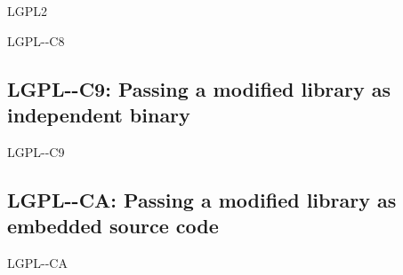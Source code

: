 \begin{license}{LGPL2}
\begin{lsuc}{LGPL-\ver-C8}
  \begin{lsucrequires}
    \lsucmandatory{\keepLicensingElements}
    \lsucmandatory{\lgpltwoEnsureCopyrightNoticeSource}
    \lsucmandatory{\giveLicense}\passingFilesCorrectly
    \lsucmandatory{\markLibraryModifications}
    \lsucmandatory{\arrangeLibraryChanges}\howToApplyTheseTerms
    \lsucoptional{\createChangelog}  
    \lsucoptional{\addToDocumentation}
    \lsucoptional{\retainCopyrightNotices}
  \end{lsucrequires}

  \begin{lsucprohibits}
  \end{lsucprohibits}
\end{lsuc}

\subsection{LGPL-\ver-C9: Passing a modified library as independent binary}
\begin{lsuc}{LGPL-\ver-C9}

  \useCaseNine

  \begin{lsucrequires}
    \lsucmandatory{\keepLicensingElements}
    \lsucmandatory{\lgpltwoEnsureCopyrightNoticeBinary}
    \lsucmandatory{\giveLicense}\passingFilesCorrectly
    \lsucmandatory{\makeModifiedSourceAvailable}
    \lsucmandatory{\describeHowToGetSource}
    \lsucmandatory{\markLibraryModifications}
    \lsucmandatory{\arrangeLibraryChanges}\howToApplyTheseTerms
    \lsucoptional{\createChangelog}
    \lsucoptional{\addToDocumentation}  
    \lsucoptional{\retainCopyrightNotices}  
  \end{lsucrequires}

  \begin{lsucprohibits}
  \end{lsucprohibits}
\end{lsuc}

\subsection{LGPL-\ver-CA: Passing a modified library as embedded source code}
\begin{lsuc}{LGPL-\ver-CA}


\end{lsuc}
\end{license}
